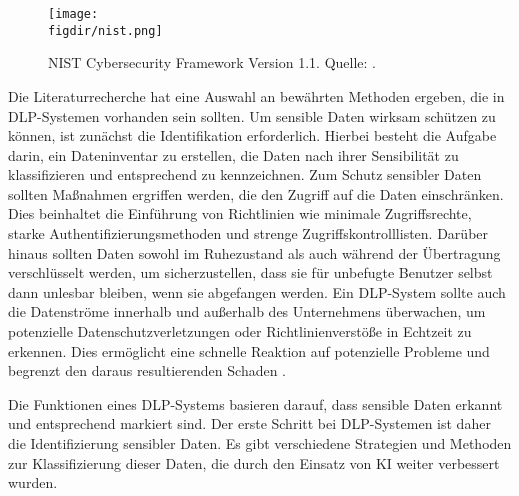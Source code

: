 \begin{figure}[htbp]
    \centering
    \texttt{[image: \\figdir/nist.png]}
    \caption{NIST Cybersecurity Framework Version 1.1. Quelle: \cite{NIST.2014}.}
    \label{f:nist}
\end{figure}

Die Literaturrecherche hat eine Auswahl an bewährten Methoden ergeben, die in DLP-Systemen vorhanden sein sollten. Um sensible Daten wirksam schützen zu können, ist zunächst die Identifikation erforderlich. Hierbei besteht die Aufgabe darin, ein Dateninventar zu erstellen, die Daten nach ihrer Sensibilität zu klassifizieren und entsprechend zu kennzeichnen. Zum Schutz sensibler Daten sollten Maßnahmen ergriffen werden, die den Zugriff auf die Daten einschränken. Dies beinhaltet die Einführung von Richtlinien wie minimale Zugriffsrechte, starke Authentifizierungsmethoden und strenge Zugriffskontrolllisten. Darüber hinaus sollten Daten sowohl im Ruhezustand als auch während der Übertragung verschlüsselt werden, um sicherzustellen, dass sie für unbefugte Benutzer selbst dann unlesbar bleiben, wenn sie abgefangen werden. Ein DLP-System sollte auch die Datenströme innerhalb und außerhalb des Unternehmens überwachen, um potenzielle Datenschutzverletzungen oder Richtlinienverstöße in Echtzeit zu erkennen. Dies ermöglicht eine schnelle Reaktion auf potenzielle Probleme und begrenzt den daraus resultierenden Schaden \cite{HerreraMontano.2022}\cite{Shishodia.2022}. %

Die Funktionen eines DLP-Systems basieren darauf, dass sensible Daten erkannt und entsprechend markiert sind. Der erste Schritt bei DLP-Systemen ist daher die Identifizierung sensibler Daten. Es gibt verschiedene Strategien und Methoden zur Klassifizierung dieser Daten, die durch den Einsatz von KI weiter verbessert wurden.

